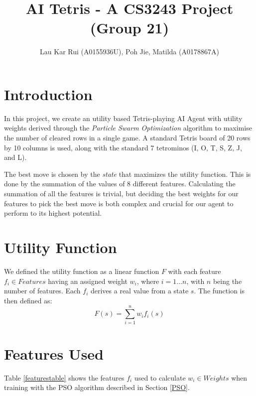 \documentclass[12pt]{article}
\title{\vspace{-4.5cm}AI Tetris - A CS3243 Project (Group 21)}
\author{Lau Kar Rui (A0155936U), Poh Jie, Matilda (A0178867A)}
\numberwithin{table}{section}
\begin{document}
 
\baselineskip17.5pt
\maketitle 

\section{Introduction}
In this project, we create an utility based Tetris-playing AI Agent with utility weights derived through the \emph{Particle Swarm Optimization} algorithm to maximise the number of cleared rows in a single game. A standard Tetris board of 20 rows by 10 columns is used, along with the standard 7 tetrominos (I, O, T, S, Z, J, and L).

The best move is chosen by the \emph{state} that maximizes the utility function. This is done by the summation of the values of 8 different features. Calculating the summation of all the features is trivial, but deciding the best weights for our features to pick the best move is both complex and crucial for our agent to perform to its highest potential. 

\section{Utility Function}\label{util-function}
We defined the utility function as a linear function $F$ with each feature $f_i \in Features$ having an assigned weight $w_i$, where $i = 1...n$, with $n$ being the number of features. Each $f_i$ derives a real value from a state $s$. The function is then defined as:
	$$F(s) = \sum_{i = 1}^{n} w_if_i(s)$$
\section{Features Used} \label{features}
Table \ref{featurestable} shows the features $f_i$ used to calculate $w_i \in Weights$ when training with the PSO algorithm described in Section \ref{PSO}. 
\end{document}

